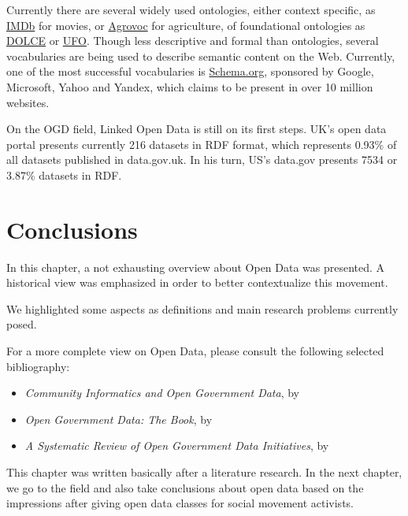 Currently there are several widely used ontologies, either context specific, as \href{http://www.imdb.com}{IMDb} for movies, or \href{http://aims.fao.org/skosmos/agrovoc/en/}{Agrovoc} for agriculture, of foundational ontologies as \href{http://www.loa.istc.cnr.it/old/DOLCE.html}{DOLCE} or \href{http://ontology.com.br/}{UFO}.
Though less descriptive and formal than ontologies, several vocabularies are being used to describe semantic content on the Web.
Currently, one of the most successful vocabularies is \href{http://schema.org}{Schema.org}, sponsored by Google, Microsoft, Yahoo and Yandex, which claims to be present in over 10 million websites.

On the OGD field, Linked Open Data is still on its first steps.
UK's open data portal presents currently 216 datasets in RDF format, which represents 0.93\% of all datasets published in data.gov.uk.
In his turn, US's data.gov presents 7534 or 3.87\% datasets in RDF.


\section{Conclusions}

In this chapter, a not exhausting overview about Open Data was presented.
A historical view was emphasized in order to better contextualize this movement.


We highlighted some aspects as definitions and main research problems currently posed.

For a more complete view on Open Data, please consult the following selected bibliography:
\begin{itemize}
\item \emph{Community Informatics and Open Government Data}, by~
\item \emph{Open Government Data: The Book}, by~
\item \emph{A Systematic Review of Open Government Data Initiatives}, by~
\end{itemize}

This chapter was written basically after a literature research.
In the next chapter, we go to the field and also take conclusions about open data based on the impressions after giving open data classes for social movement activists.


